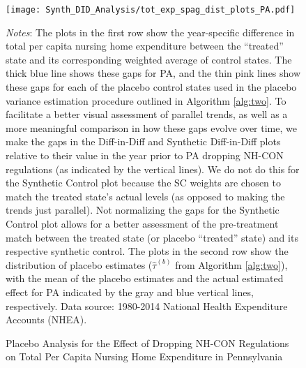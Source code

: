 \documentclass[../Main.tex]{subfiles}
\begin{document}
\newpage
\begin{figure}[t]
	\begin{center}
	\caption{\label{fig: tot_exp_spag_plots_pa} \centering Placebo Analysis for the Effect of Dropping NH-CON Regulations on Total Per Capita Nursing Home Expenditure in Pennsylvania}
    \texttt{[image: Synth\_DID\_Analysis/tot\_exp\_spag\_dist\_plots\_PA.pdf]}
    \end{center}
    \footnotesize
		\textit{Notes}: The plots in the first row show the year-specific difference in total per capita nursing home expenditure between the ``treated'' state and its corresponding weighted average of control states. The thick blue line shows these gaps for PA, and the thin pink lines show these gaps for each of the placebo control states used in the placebo variance estimation procedure outlined in Algorithm \ref{alg:two}. To facilitate a better visual assessment of parallel trends, as well as a more meaningful comparison in how these gaps evolve over time, we make the gaps in the Diff-in-Diff and Synthetic Diff-in-Diff plots relative to their value in the year prior to PA dropping NH-CON regulations (as indicated by the vertical lines). We do not do this for the Synthetic Control plot because the SC weights are chosen to match the treated state's actual levels (as opposed to making the trends just parallel). Not normalizing the gaps for the Synthetic Control plot allows for a better assessment of the pre-treatment match between the treated state (or placebo ``treated'' state) and its respective synthetic control. The plots in the second row show the distribution of placebo estimates ($\hat{\tau}^{(b)}$ from Algorithm \ref{alg:two}), with the mean of the placebo estimates and the actual estimated effect for PA indicated by the gray and blue vertical lines, respectively. Data source: 1980-2014 National Health Expenditure Accounts (NHEA).
\end{figure}
\clearpage
\end{document}
